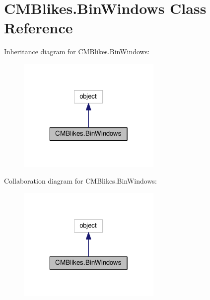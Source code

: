 \hypertarget{classCMBlikes_1_1BinWindows}{}\section{C\+M\+Blikes.\+Bin\+Windows Class Reference}
\label{classCMBlikes_1_1BinWindows}


Inheritance diagram for C\+M\+Blikes.\+Bin\+Windows\+:
\nopagebreak
\begin{figure}[H]
\begin{center}
\leavevmode
\includegraphics[width=196pt]{classCMBlikes_1_1BinWindows__inherit__graph}
\end{center}
\end{figure}


Collaboration diagram for C\+M\+Blikes.\+Bin\+Windows\+:
\nopagebreak
\begin{figure}[H]
\begin{center}
\leavevmode
\includegraphics[width=196pt]{classCMBlikes_1_1BinWindows__coll__graph}
\end{center}
\end{figure}
